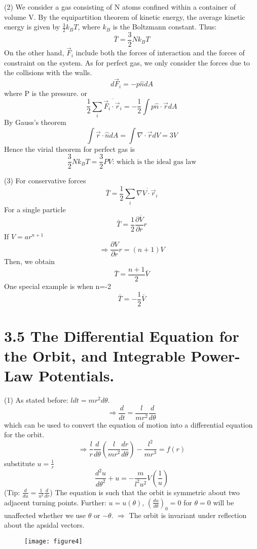 \documentclass{article}
\begin{document}
    (2) We consider a gas consisting of N atoms confined within a container of volume V.
    By the equipartition theorem of kinetic energy, the average kinetic energy is given by $\frac{3}{2}k_BT$, where $k_B$ is the Boltzmann constant.
    Thus:
    \[ \bar{T} = \frac{3}{2}Nk_BT \]
    On the other hand, $\vec{F}_i$ include both the forces of interaction and the forces of constraint on the system. As for perfect gas, we only consider the forces due to the collisions with the walls.
    \[ d\vec{F}_i = -p\hat{n}dA \]
    where P is the pressure.
    or
    \[ \frac{1}{2}\sum_i \overline{\vec{F}_i \cdot \vec{r}_i} = -\frac{1}{2}\int p\hat{n} \cdot \vec{r} dA \]
    By Gauss's theorem
    \[ \int \vec{r} \cdot \hat{n} dA = \int \nabla \cdot \vec{r} dV = 3V \]
    Hence the virial theorem for perfect gas is
    \[ \frac{3}{2}Nk_BT = \frac{3}{2}PV \text{: which is the ideal gas law} \]
    
    (3) For conservative forces
    \[ \bar{T} = \frac{1}{2} \sum_i \overline{\nabla V \cdot \vec{r}_i} \]
    For a single particle
    \[ \bar{T} = \frac{1}{2} \overline{\frac{\partial V}{\partial r} r} \]
    If $V = ar^{n+1}$
    \[ \Rightarrow \frac{\partial V}{\partial r} r = (n+1) V \]
    Then, we obtain
    \[ \bar{T} = \frac{n+1}{2}\bar{V} \]
    One special example is when n=-2
    \[ \bar{T} = -\frac{1}{2}\bar{V} \]
    
    \section*{3.5 The Differential Equation for the Orbit, and Integrable Power-Law Potentials.}
    (1) As stated before: $ldt = mr^2d\theta$.
    \[ \Rightarrow \frac{d}{dt} = \frac{l}{mr^2}\frac{d}{d\theta} \]
    which can be used to convert the equation of motion into a differential equation for the orbit.
    \[ \Rightarrow \frac{l}{r} \frac{d}{d\theta}(\frac{l}{mr^2}\frac{dr}{d\theta}) - \frac{l^2}{mr^3} = f(r) \]
    substitute $u = \frac{1}{r}$
    \[ \frac{d^2u}{d\theta^2} + u = -\frac{m}{l^2u^2}V(\frac{1}{u}) \]
    (Tip: $\frac{d}{du} = \frac{1}{u^2}\frac{d}{dr}$)
    The equation is such that the orbit is symmetric about two adjacent turning points.
    Further: $u=u(\theta)$, $(\frac{du}{d\theta})_0 = 0$ for $\theta=0$ will be unaffected whether we use $\theta$ or $-\theta$.
    $\Rightarrow$ The orbit is invariant under reflection about the apsidal vectors.
    
    \begin{figure}[h]
    	\centering
    	\texttt{[image: figure4]}
    	\caption{}
    	\label{fig:figure4}
    \end{figure}
    
\end{document}
